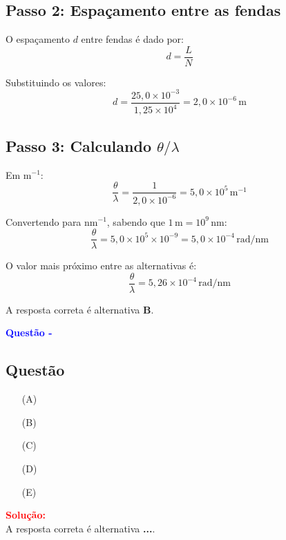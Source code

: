 \begin{flushleft}
\subsection*{Passo 2: Espaçamento entre as fendas}

O espaçamento \(d\) entre fendas é dado por:
\[
d = \frac{L}{N}
\]

Substituindo os valores:
\[
d = \frac{25{,}0 \times 10^{-3}}{1{,}25 \times 10^4} = 2{,}0 \times 10^{-6}\,\mathrm{m}
\]

\subsection*{Passo 3: Calculando \( \theta/\lambda \)}

Em \(\mathrm{m}^{-1}\):
\[
\frac{\theta}{\lambda} = \frac{1}{2{,}0 \times 10^{-6}} = 5{,}0 \times 10^{5}\,\mathrm{m}^{-1}
\]

Convertendo para \(\mathrm{nm}^{-1}\), sabendo que \(1\,\mathrm{m} = 10^{9}\,\mathrm{nm}\):
\[
\frac{\theta}{\lambda} = 5{,}0 \times 10^{5} \times 10^{-9} = 5{,}0 \times 10^{-4}\,\mathrm{rad/nm}
\]

O valor mais próximo entre as alternativas é:
\[
\boxed{\frac{\theta}{\lambda} = 5{,}26 \times 10^{-4}\,\mathrm{rad/nm}}
\]


A resposta correta é alternativa \colorbox{green!50}{\textbf{B}}.
\end{flushleft}

\begin{flushleft}
\textbf{\textcolor{blue}{\Large Quest\~ao - }}\\
\noindent

\subsection{Quest\~ao }

\begin{itemize}
\item[(A)] 
\item[(B)] 
\item[(C)]
\item[(D)] 
\item[(E)] 
\end{itemize}

\vspace{0.5cm}

\textcolor{red}{\textbf{Solução:}}\\


A resposta correta é alternativa \colorbox{green!50}{\textbf{...}}.

\end{flushleft}